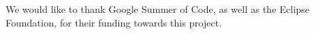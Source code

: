 \acks%
We would like to thank Google Summer of Code, as well as the
Eclipse Foundation, for their funding towards this project.
